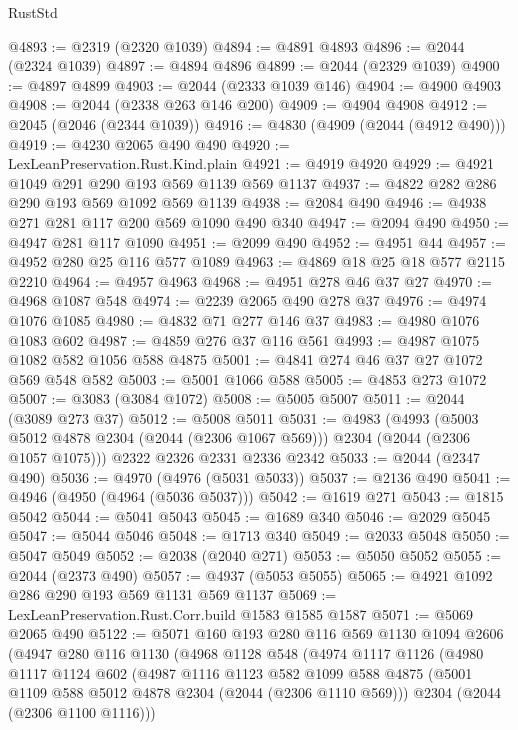 \begin{lexlean}{RustStd}
\begin{coremodule}
{\begin{coremodule}
{{{{{{{{{{{{{{@4893 := @2319 (@2320 @1039)
@4894 := @4891 @4893
@4896 := @2044 (@2324 @1039)
@4897 := @4894 @4896
@4899 := @2044 (@2329 @1039)
@4900 := @4897 @4899
@4903 := @2044 (@2333 @1039 @146)
@4904 := @4900 @4903
@4908 := @2044 (@2338 @263 @146 @200)
@4909 := @4904 @4908
@4912 := @2045 (@2046 (@2344 @1039))
@4916 := @4830 (@4909 (@2044 (@4912 @490)))
@4919 := @4230 @2065 @490 @490
@4920 := LexLeanPreservation.Rust.Kind.plain
@4921 := @4919 @4920
@4929 := @4921 @1049 @291 @290 @193 @569 @1139 @569 @1137
@4937 := @4822 @282 @286 @290 @193 @569 @1092 @569 @1139
@4938 := @2084 @490
@4946 := @4938 @271 @281 @117 @200 @569 @1090 @490 @340
@4947 := @2094 @490
@4950 := @4947 @281 @117 @1090
@4951 := @2099 @490
@4952 := @4951 @44
@4957 := @4952 @280 @25 @116 @577 @1089
@4963 := @4869 @18 @25 @18 @577 @2115 @2210
@4964 := @4957 @4963
@4968 := @4951 @278 @46 @37 @27
@4970 := @4968 @1087 @548
@4974 := @2239 @2065 @490 @278 @37
@4976 := @4974 @1076 @1085
@4980 := @4832 @71 @277 @146 @37
@4983 := @4980 @1076 @1083 @602
@4987 := @4859 @276 @37 @116 @561
@4993 := @4987 @1075 @1082 @582 @1056 @588 @4875
@5001 := @4841 @274 @46 @37 @27 @1072 @569 @548 @582
@5003 := @5001 @1066 @588
@5005 := @4853 @273 @1072
@5007 := @3083 (@3084 @1072)
@5008 := @5005 @5007
@5011 := @2044 (@3089 @273 @37)
@5012 := @5008 @5011
@5031 := @4983
    (@4993 (@5003 @5012 @4878 @2304 (@2044 (@2306 @1067 @569))) @2304 (@2044 (@2306 @1057 @1075)))
    @2322
    @2326
    @2331
    @2336
    @2342
@5033 := @2044 (@2347 @490)
@5036 := @4970 (@4976 (@5031 @5033))
@5037 := @2136 @490
@5041 := @4946 (@4950 (@4964 (@5036 @5037)))
@5042 := @1619 @271
@5043 := @1815 @5042
@5044 := @5041 @5043
@5045 := @1689 @340
@5046 := @2029 @5045
@5047 := @5044 @5046
@5048 := @1713 @340
@5049 := @2033 @5048
@5050 := @5047 @5049
@5052 := @2038 (@2040 @271)
@5053 := @5050 @5052
@5055 := @2044 (@2373 @490)
@5057 := @4937 (@5053 @5055)
@5065 := @4921 @1092 @286 @290 @193 @569 @1131 @569 @1137
@5069 := LexLeanPreservation.Rust.Corr.build @1583 @1585 @1587
@5071 := @5069 @2065 @490
@5122 := @5071
    @160
    @193
    @280
    @116
    @569
    @1130
    @1094
    @2606
    (@4947
      @280
      @116
      @1130
      (@4968
        @1128
        @548
        (@4974
          @1117
          @1126
          (@4980
            @1117
            @1124
            @602
            (@4987
              @1116
              @1123
              @582
              @1099
              @588
              @4875
              (@5001 @1109 @588 @5012 @4878 @2304 (@2044 (@2306 @1110 @569)))
              @2304
              (@2044 (@2306 @1100 @1116)))
}}}}}}}}}}}}}}
\end{coremodule}}
\end{coremodule}
\end{lexlean}
